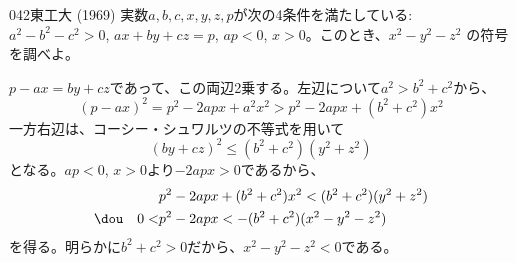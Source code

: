 \begin{thm}{042}{}{東工大 (1969)}
 実数$a,b,c,x,y,z,p$が次の4条件を満たしている: $a^2-b^2-c^2>0$, $ax+by+cz=p$, $ap<0$, $x>0$。このとき、$x^2-y^2-z^2$ の符号を調べよ。
\end{thm}

$p-ax=by+cz$であって、この両辺2乗する。左辺について$a^2>b^2+c^2$から、
\[ (p-ax)^2=p^2-2apx+a^2x^2>p^2-2apx+(b^2+c^2)x^2 \]
一方右辺は、コーシー・シュワルツの不等式を用いて
\[ (by+cz)^2\le (b^2+c^2)(y^2+z^2) \]
となる。$ap<0$, $x>0$より$-2apx>0$であるから、
\begin{align*}
 &p^2-2apx+(b^2+c^2)x^2<(b^2+c^2)(y^2+z^2) \\
 \dou\quad 0<&p^2-2apx<-(b^2+c^2)(x^2-y^2-z^2)
\end{align*}
を得る。明らかに$b^2+c^2>0$だから、$x^2-y^2-z^2<0$である。